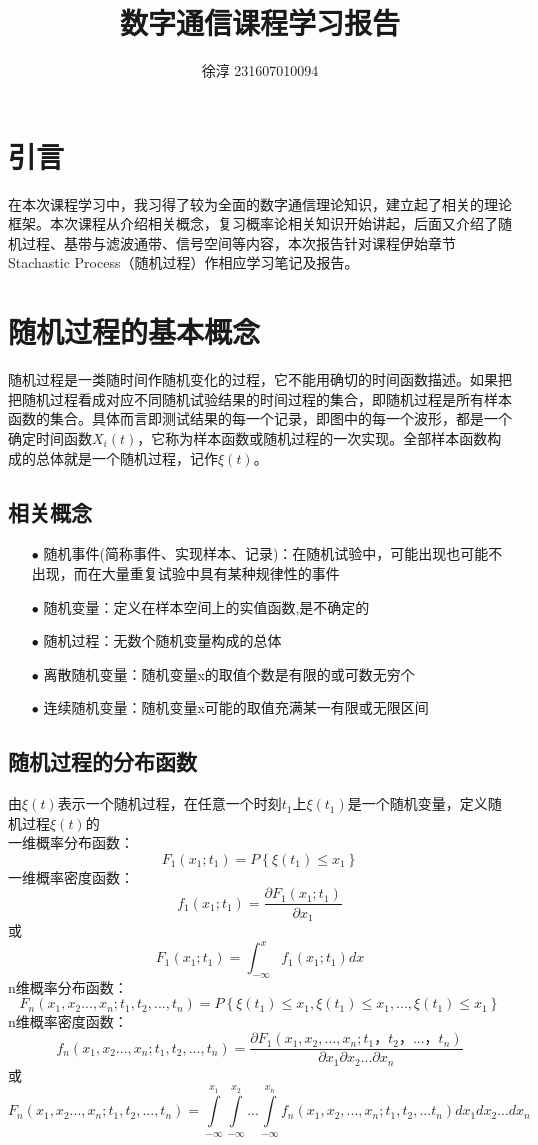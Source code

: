 \documentclass[12pt,a4paper,oneside]{ctexart}
\title{\vspace{-4cm}\textbf{数字通信课程学习报告}}
\author{徐淳 231607010094}
\begin{document}
\maketitle
\section{引言}  
在本次课程学习中，我习得了较为全面的数字通信理论知识，建立起了相关的理论框架。本次课程从介绍相关概念，复习概率论相关知识开始讲起，后面又介绍了随机过程、基带与滤波通带、信号空间等内容，本次报告针对课程伊始章节Stachastic Process（随机过程）作相应学习笔记及报告。
\section{随机过程的基本概念}
随机过程是一类随时间作随机变化的过程，它不能用确切的时间函数描述。如果把把随机过程看成对应不同随机试验结果的时间过程的集合，即随机过程是所有样本函数的集合。具体而言即测试结果的每一个记录，即图中的每一个波形，都是一个确定时间函数$X_{i}(t)$，它称为样本函数或随机过程的一次实现。全部样本函数构成的总体就是一个随机过程，记作$\xi(t)$。
    \subsection{相关概念}
        \begin{itemize}
            \item[$\bullet$] 随机事件(简称事件、实现样本、记录)：在随机试验中，可能出现也可能不出现，而在大量重复试验中具有某种规律性的事件
            \item[$\bullet$] 随机变量：定义在样本空间上的实值函数,是不确定的
            \item[$\bullet$] 随机过程：无数个随机变量构成的总体
            \item[$\bullet$] 离散随机变量：随机变量x的取值个数是有限的或可数无穷个
            \item[$\bullet$] 连续随机变量：随机变量x可能的取值充满某一有限或无限区间  
        \end{itemize}
    \subsection{随机过程的分布函数}
    由$\xi(t)$表示一个随机过程，在任意一个时刻$t_{1}$上$\xi (t_{1})$是一个随机变量，定义随机过程$\xi(t)$的\\
    一维概率分布函数：
    $$
    F_{1} (x_{1};t_{1}) = P\left \{ \xi(t_{1})\le  x_{1} \right \}
    $$
    一维概率密度函数：
    $$
    f_{1} (x_{1};t_{1}) = \frac{\partial F_{1} (x_{1};t_{1})}{\partial x_{1}}
    $$
    或
    $$F_{1} (x_{1};t_{1}) = \int_{-\infty }^{x}  f_{1} (x_{1};t_{1})dx
    $$
    n维概率分布函数：
    $$
    F_{n} (x_{1},x_{2}...,x_{n};t_{1},t_{2},...,t_{n}) = P\left \{ \xi(t_{1})\le  x_{1} ,\xi(t_{1})\le  x_{1},...,\xi(t_{1})\le  x_{1}\right \}
    $$
    n维概率密度函数：
    $$
    f_{n} (x_{1},x_{2}...,x_{n};t_{1},t_{2},...,t_{n}) = \frac{\partial F_{1} (x_{1},x_{2},...,x_{n};t_{1}，t_{2}，...，t_{n})}{\partial x_{1}\partial x_{2}...\partial x_{n}}
    $$
    或
    $$
    F_{n} (x_{1},x_{2}...,x_{n};t_{1},t_{2},...,t_{n}) = \int\limits_{-\infty }^{x_{1}} \int\limits_{-\infty }^{x_{2}}...\int\limits_{-\infty }^{x_{n}}f_{n}(x_{1},x_{2},...,x_{n};t_{1},t_{2},...t_{n})dx_{1}dx_{2}...dx_{n}
    $$
\end{document}
